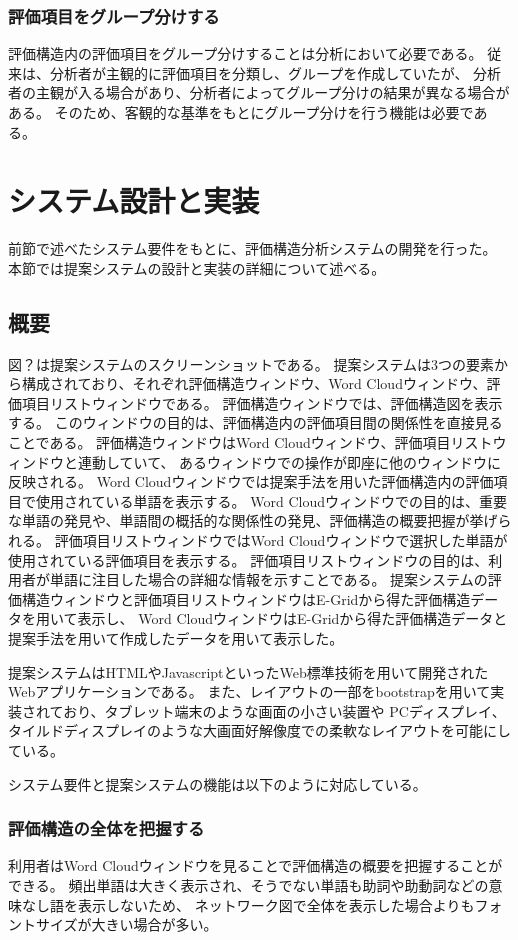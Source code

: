 \documentclass[syuuron]{kuee}
\begin{document}
		\subsubsection{評価項目をグループ分けする}%
			評価構造内の評価項目をグループ分けすることは分析において必要である。
			従来は、分析者が主観的に評価項目を分類し、グループを作成していたが、
			分析者の主観が入る場合があり、分析者によってグループ分けの結果が異なる場合がある。
			そのため、客観的な基準をもとにグループ分けを行う機能は必要である。
	\section{システム設計と実装}
		前節で述べたシステム要件をもとに、評価構造分析システムの開発を行った。
		本節では提案システムの設計と実装の詳細について述べる。
		\subsection{概要}
			図？は提案システムのスクリーンショットである。
			提案システムは3つの要素から構成されており、それぞれ評価構造ウィンドウ、Word Cloudウィンドウ、評価項目リストウィンドウである。
			評価構造ウィンドウでは、評価構造図を表示する。
			このウィンドウの目的は、評価構造内の評価項目間の関係性を直接見ることである。
			評価構造ウィンドウはWord Cloudウィンドウ、評価項目リストウィンドウと連動していて、
			あるウィンドウでの操作が即座に他のウィンドウに反映される。
			Word Cloudウィンドウでは提案手法を用いた評価構造内の評価項目で使用されている単語を表示する。
			Word Cloudウィンドウでの目的は、重要な単語の発見や、単語間の概括的な関係性の発見、評価構造の概要把握が挙げられる。
			評価項目リストウィンドウではWord Cloudウィンドウで選択した単語が使用されている評価項目を表示する。
			評価項目リストウィンドウの目的は、利用者が単語に注目した場合の詳細な情報を示すことである。
			提案システムの評価構造ウィンドウと評価項目リストウィンドウはE-Gridから得た評価構造データを用いて表示し、
			Word CloudウィンドウはE-Gridから得た評価構造データと提案手法を用いて作成したデータを用いて表示した。
			
			提案システムはHTMLやJavascriptといったWeb標準技術を用いて開発されたWebアプリケーションである。
			また、レイアウトの一部をbootstrapを用いて実装されており、タブレット端末のような画面の小さい装置や
			PCディスプレイ、タイルドディスプレイのような大画面好解像度での柔軟なレイアウトを可能にしている。
			
			システム要件と提案システムの機能は以下のように対応している。
			\subsubsection{評価構造の全体を把握する}
				利用者はWord Cloudウィンドウを見ることで評価構造の概要を把握することができる。
				頻出単語は大きく表示され、そうでない単語も助詞や助動詞などの意味なし語を表示しないため、
				ネットワーク図で全体を表示した場合よりもフォントサイズが大きい場合が多い。				
\end{document}
